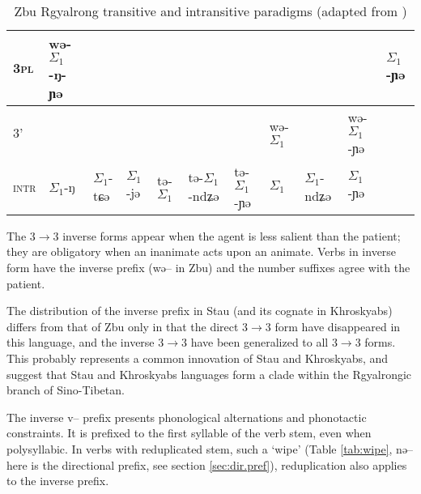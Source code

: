 \documentclass[oldfontcommands,twoside,usletter,12pt]{memoir}
\newcommand{\ipa}[1]{{\phon #1}} %
\newcommand{\grise}[1]{\cellcolor{lightgray}\textbf{#1}}
\newcommand{\ra}{$\Sigma_1$}
\begin{document}
\begin{landscape}
\begin{table}[h]
\begin{tabular}{lllllllllll}
\textsc{3pl} &  \cellcolor[wave]{500}	\ipa{wə-\ra{}-ŋ-ɲə} & 	\cellcolor[wave]{500} & \cellcolor[wave]{500} & 	\cellcolor[wave]{500} & 	\cellcolor[wave]{500} & 	\cellcolor[wave]{500} & \multicolumn{3}{c}{\grise{}} &	\ipa{\ra{}-ɲə} \\ 	
\midrule
\textsc{3'} & 	\multicolumn{6}{c}{\grise{}} &\cellcolor[wave]{500}	\ipa{wə-\ra{}} & 	\cellcolor[wave]{500}\ipa{wə-\ra{}-ndʑə} & \cellcolor[wave]{500}	\ipa{wə-\ra{}-ɲə} & 	\grise{} \\	
\midrule
\textsc{intr}&\ipa{\ra{}-ŋ}&\ipa{\ra{}-tɕə}&\ipa{\ra{}-jə}&\ipa{tə-\ra{}}&\ipa{tə-\ra{}-ndʑə}&\ipa{tə-\ra{}-ɲə}&\ipa{\ra{}}&\ipa{\ra{}-ndʑə} &\ipa{\ra{}-ɲə}& 	\grise{} \\	
	\bottomrule
\end{tabular}
\caption{Zbu Rgyalrong transitive and intransitive paradigms (adapted from \citealt{gongxun14agreement})} \label{tab:zbu.tr}
\end{table}
\end{landscape}


The 3$\rightarrow$3 inverse forms appear when the agent is less salient than the patient; they are obligatory when an inanimate acts upon an animate. Verbs in inverse form have the inverse prefix (\ipa{wə}-- in Zbu) and the number suffixes agree with the patient.

The distribution of the inverse prefix in Stau (and its cognate in Khroskyabs) differs from that of Zbu only in that the direct 3$\rightarrow$3 form have disappeared in this language, and the inverse 3$\rightarrow$3 have been generalized to all 3$\rightarrow$3 forms. This probably represents a common innovation of Stau and Khroskyabs, and suggest that Stau and Khroskyabs languages form a clade within the Rgyalrongic branch of Sino-Tibetan.


The inverse \ipa{v}-- prefix presents phonological alternations and phonotactic constraints. It is prefixed to the first syllable of the verb stem, even when polysyllabic. In verbs with reduplicated stem, such a `wipe' (Table \ref{tab:wipe}, \ipa{nə--} here is the directional prefix, see section \ref{sec:dir.pref}), reduplication also applies to the inverse prefix.
\end{document}
